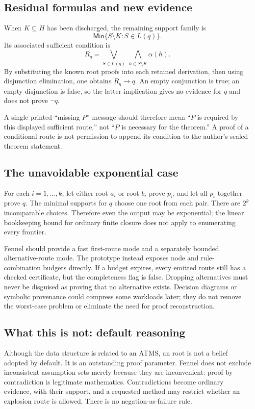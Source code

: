 \documentclass[11pt,a4paper]{article}
\theoremstyle{definition}
\theoremstyle{remark}
\newcommand{\code}[1]{\texttt{\detokenize{#1}}}
\newcommand{\Min}{\mathsf{Min}}
\begin{document}
\subsection{Residual formulas and new evidence}
When $K\subseteq H$ has been discharged, the remaining support family is
\[
 \Min\{S\setminus K:S\in L(q)\}.
\]
Its associated sufficient condition is
\begin{equation}\label{eq:residual}
 R_q=\bigvee_{S\in L(q)}\ \bigwedge_{h\in S\setminus K}\alpha(h).
\end{equation}
By substituting the known root proofs into each retained derivation, then using
disjunction elimination, one obtains $R_q\to q$. An empty conjunction is true;
an empty disjunction is false, so the latter implication gives no evidence for
$q$ and does not prove $\neg q$.

A single printed ``missing $P$'' message should therefore mean ``$P$ is required
by this displayed sufficient route,'' not ``$P$ is necessary for the theorem.''
A proof of a conditional route is not permission to append its condition to the
author's sealed theorem statement.

\subsection{The unavoidable exponential case}
For each $i=1,\ldots,k$, let either root $a_i$ or root $b_i$ prove $p_i$, and
let all $p_i$ together prove $q$. The minimal supports for $q$ choose one root
from each pair. There are $2^k$ incomparable choices. Therefore even the output
may be exponential; the linear bookkeeping bound for ordinary finite closure
does not apply to enumerating every frontier.

Fennel should provide a fast first-route mode and a separately bounded
alternative-route mode. The prototype instead exposes node and rule-combination
budgets directly. If a budget expires, every emitted route still has a checked
certificate, but the completeness flag is false. Dropping alternatives must
never be disguised as proving that no alternative exists. Decision diagrams or
symbolic provenance could compress some workloads later; they do not remove
the worst-case problem or eliminate the need for proof reconstruction.

\subsection{What this is not: default reasoning}
Although the data structure is related to an ATMS, an \code{ask} root is not a
belief adopted by default. It is an outstanding proof parameter. Fennel does
not exclude inconsistent assumption sets merely because they are inconvenient:
proof by contradiction is legitimate mathematics. Contradictions become
ordinary evidence, with their support, and a requested method may restrict
whether an explosion route is allowed. There is no negation-as-failure rule.
\end{document}
